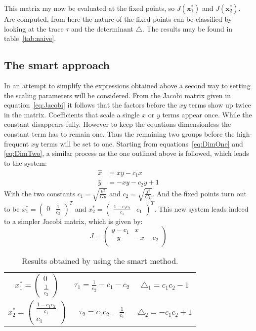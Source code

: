 This matrix my now be evaluated at the fixed points, so $J(\mathbf{x}^*_1)$ and $J(\mathbf{x}^*_2)$. Are computed, from here the nature of the fixed points can be classified by looking at the trace $\tau$ and the determinant $\triangle$. The results may be found in table~\ref{tab:naive}.

\subsection{The smart approach}
In an attempt to simplify the expressions obtained above a second way to setting the scaling parameters will be considered. From the Jacobi matrix given in equation~\ref{eq:Jacobi} it follows that the factors before the $xy$ terms show up twice in the matrix. Coefficients that scale a single $x$ or $y$ terms appear once. While the constant disappears fully. However to keep the equations dimensionless the constant term has to remain one. Thus the remaining two groups before the high-frequent $xy$ terms will be set to one. Starting from equations~\ref{eq:DimOne} and \ref{eq:DimTwo}, a similar process as the one outlined above is followed, which leads to the system:
\begin{align}
\hat{x} &= xy - c_1 x \\
\hat{y} &= -xy - c_2 y + 1
\end{align}  
With the two constants $c_1 = \sqrt{\frac{k^2}{Gp}}$ and $c_2 = \sqrt{\frac{f^2}{Gp}}$. And the fixed points turn out to be $x_1^* = \begin{pmatrix} 0 & \frac{1}{c_2} \end{pmatrix}^T$ and $x_2^* = \begin{pmatrix} \frac{1- c_1c_2 }{c_1} & c_1 \end{pmatrix}^T$.
This new system leads indeed to a simpler Jacobi matrix, which is given by:
\begin{equation}
J = \begin{pmatrix}
y - c_1 & x \\
-y & -x - c_2 \\
\end{pmatrix}
\end{equation}
\begin{table}
\centering
\begin{tabular}{|c|c|c|}
\hline
$x_1^* = \begin{pmatrix} 0 \\ \frac{1}{c_2} \end{pmatrix}$ 
& $\tau_1 = \frac{1}{c_2} - c_1 - c_2$  & $\triangle_1 = c_1 c_2 - 1$ \\
$x_2^* = \begin{pmatrix} \frac{1- c_1c_2 }{c_1} \\ c_1 \end{pmatrix}$ 
& $\tau_2 = c_1 c_2 - \frac{1}{c_1}$  & $\triangle_2 = - c_1 c_2 + 1$ \\
\hline
\end{tabular}
\caption{Results obtained by using the smart method.}
\label{tab:smart}
\end{table}
